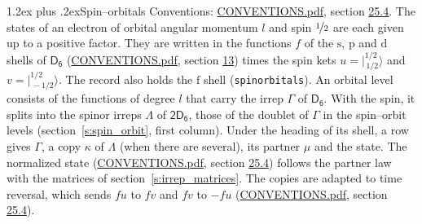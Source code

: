 \documentclass[10pt,a4paper]{article}
\makeatletter
\renewcommand\section{\@startsection{section}{1}{\z@}{-3ex plus -1ex minus -.2ex}%
  {1.2ex plus .2ex}{\normalfont\large\sffamily\bfseries\color{parttitle}}}
\numberwithin{equation}{section}
\newcommand{\grp}[1]{\mathsf{#1}}
\newcommand{\orbital}[1]{\mathrm{#1}}
\newcommand{\mult}{\kappa}
\newcommand{\intx}{\mu}
\newcommand{\jm}[2]{\bigl\lvert{}^{#1}_{\,#2}\bigr\rangle}
\makeatother
\begin{document}
\section{Spin--orbitals}\label{s:spin_orbitals}
Conventions: \href{../../CONVENTIONS.pdf}{CONVENTIONS.pdf}, section \href{../../CONVENTIONS.pdf\#conv.25.4}{25.4}.
\leavevmode\label{n:index.orbital.l}The states of an electron of orbital angular momentum $l$ and spin $\nicefrac{1}{2}$ are each given up to a positive factor. \label{n:local.spinor.uv}\label{n:local.function.f}They are written in the functions $f$ of the $\orbital{s}$, $\orbital{p}$ and $\orbital{d}$ shells of \href{../../../rotation/data/pdf/D6.pdf}{$\grp{D_{6}}$} (\href{../../CONVENTIONS.pdf}{CONVENTIONS.pdf}, section \href{../../../rotation/CONVENTIONS.pdf\#conv.13}{13}) times the spin kets $u = \jm{1/2}{1/2}$ and $v = \jm{1/2}{-1/2}$. The record also holds the $\orbital{f}$ shell (\texttt{spinorbitals}). An orbital level consists of the functions of degree $l$ that carry the irrep $\Gamma$ of \href{../../../rotation/data/pdf/D6.pdf}{$\grp{D_{6}}$}. With the spin, it splits into the spinor irreps $\Lambda$ of $\grp{2D_{6}}$, those of the doublet of $\Gamma$ in the spin--orbit levels (section~\ref{s:spin_orbit}, first column). \label{n:head.state}Under the heading of its shell, a row gives $\Gamma$, a copy $\mult$ of $\Lambda$ (when there are several), its partner $\intx$ and the state. The normalized state (\href{../../CONVENTIONS.pdf}{CONVENTIONS.pdf}, section \href{../../CONVENTIONS.pdf\#conv.25.4}{25.4}) follows the partner law with the matrices of section~\ref{s:irrep_matrices}. The copies are adapted to time reversal, which sends $f u$ to $f v$ and $f v$ to $-f u$ (\href{../../CONVENTIONS.pdf}{CONVENTIONS.pdf}, section \href{../../CONVENTIONS.pdf\#conv.25.4}{25.4}).
\end{document}
